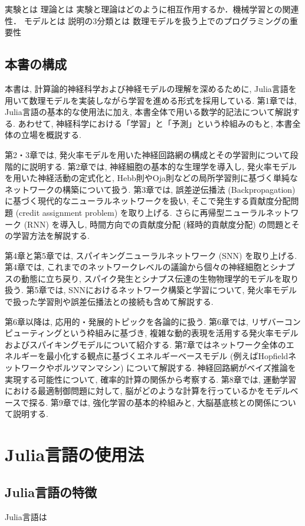 \documentclass[titlepage]{ltjsbook}
\begin{document}
実験とは
理論とは
実験と理論はどのように相互作用するか．機械学習との関連性．
モデルとは
説明の3分類とは
数理モデルを扱う上でのプログラミングの重要性

\subsection{本書の構成}
本書は, 計算論的神経科学および神経モデルの理解を深めるために, Julia言語を用いて数理モデルを実装しながら学習を進める形式を採用している. 第1章では, Julia言語の基本的な使用法に加え, 本書全体で用いる数学的記法について解説する. あわせて, 神経科学における「学習」と「予測」という枠組みのもと, 本書全体の立場を概説する. 

第2・3章では, 発火率モデルを用いた神経回路網の構成とその学習則について段階的に説明する. 第2章では, 神経細胞の基本的な生理学を導入し, 発火率モデルを用いた神経活動の定式化と, Hebb則やOja則などの局所学習則に基づく単純なネットワークの構築について扱う. 第3章では, 誤差逆伝播法 (Backpropagation) に基づく現代的なニューラルネットワークを扱い, そこで発生する貢献度分配問題 (credit assignment problem) を取り上げる. さらに再帰型ニューラルネットワーク (RNN) を導入し, 時間方向での貢献度分配 (経時的貢献度分配) の問題とその学習方法を解説する. 

第4章と第5章では, スパイキングニューラルネットワーク (SNN) を取り上げる. 第4章では, これまでのネットワークレベルの議論から個々の神経細胞とシナプスの動態に立ち戻り, スパイク発生とシナプス伝達の生物物理学的モデルを取り扱う. 第5章では, SNNにおけるネットワーク構築と学習について, 発火率モデルで扱った学習則や誤差伝播法との接続も含めて解説する. 

第6章以降は, 応用的・発展的トピックを各論的に扱う. 第6章では, リザバーコンピューティングという枠組みに基づき, 複雑な動的表現を活用する発火率モデルおよびスパイキングモデルについて紹介する. 第7章ではネットワーク全体のエネルギーを最小化する観点に基づくエネルギーベースモデル (例えばHopfieldネットワークやボルツマンマシン) について解説する. 神経回路網がベイズ推論を実現する可能性について, 確率的計算の関係から考察する. 第8章では, 運動学習における最適制御問題に対して, 脳がどのような計算を行っているかをモデルベースで探る. 第9章では, 強化学習の基本的枠組みと, 大脳基底核との関係について説明する. 

\section{Julia言語の使用法}
\subsection{Julia言語の特徴}
Julia言語は
\end{document}
